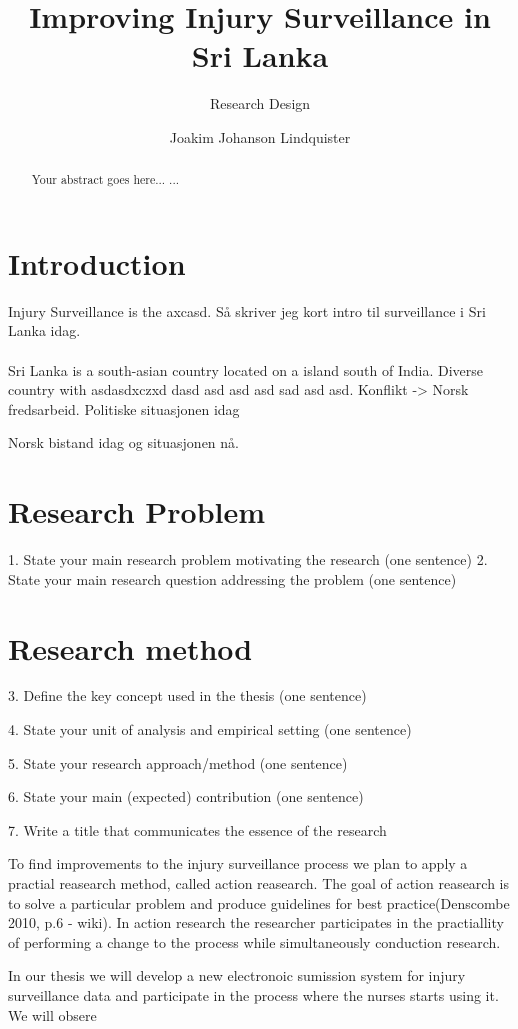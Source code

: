 \documentclass[UKenglish]{article}
\title{Improving Injury Surveillance in Sri Lanka}
\subtitle{Research Design}
\author{Joakim Johanson Lindquister}
\begin{document}
\ififorside{}
\begin{abstract}
Your abstract goes here...
...
\end{abstract}
\section*{Introduction} 
Injury Surveillance is the axcasd. Så skriver jeg kort intro til surveillance i Sri Lanka idag. 
\\ \\
Sri Lanka is a south-asian country located on a island south of India. Diverse country with asdasdxczxd dasd asd asd asd sad asd asd. Konflikt -> Norsk fredsarbeid. Politiske situasjonen idag

Norsk bistand idag og situasjonen nå. 


\section*{Research Problem}
1. State your main research problem motivating the research (one sentence)
2. State your main research question addressing the problem (one sentence)

\section*{Research method}
3. Define the key concept used in the thesis (one sentence)

4. State your unit of analysis and empirical setting (one sentence)

5. State your research approach/method (one sentence)

6. State your main (expected) contribution (one sentence)

7. Write a title that communicates the essence of the research

To find improvements to the injury surveillance process we plan to apply a practial reasearch method, called action reasearch. The goal of action reasearch is to solve a particular problem and produce guidelines for best practice(Denscombe 2010, p.6 - wiki). In action research the researcher participates in the practiallity of performing a change to the process while simultaneously conduction research.

In our thesis we will develop a new electronoic sumission system for injury surveillance data and participate in the process where the nurses starts using it. We will obsere 
\end{document}
